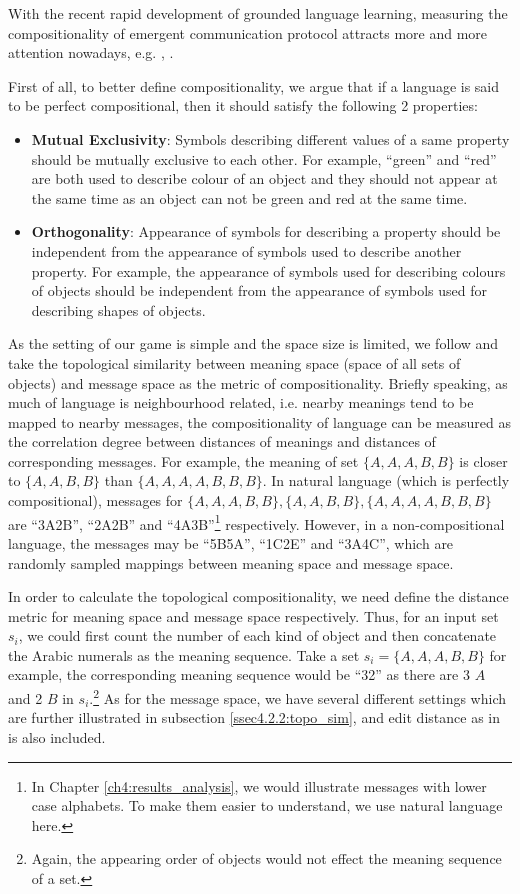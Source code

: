 With the recent rapid development of grounded language learning, measuring the compositionality of emergent communication protocol attracts more and more attention nowadays, e.g. \cite{andreas2019measuring}, \cite{lowe2019pitfalls}.

First of all, to better define compositionality, we argue that if a language is said to be perfect compositional, then it should satisfy the following 2 properties:

\begin{itemize}
    \item \textbf{Mutual Exclusivity}: Symbols describing different values of a same property should be mutually exclusive to each other. For example, ``green'' and ``red'' are both used to describe colour of an object and they should not appear at the same time as an object can not be green and red at the same time.
    \item \textbf{Orthogonality}: Appearance of symbols for describing a property should be independent from the appearance of symbols used to describe another property. For example, the appearance of symbols used for describing colours of objects should be independent from the appearance of symbols used for describing shapes of objects.
\end{itemize}

As the setting of our game is simple and the space size is limited, we follow \cite{brighton2006understanding} and take the topological similarity between meaning space (space of all sets of objects) and message space as the metric of compositionality. Briefly speaking, as much of language is neighbourhood related, i.e. nearby meanings tend to be mapped to nearby messages, the compositionality of language can be measured as the correlation degree between distances of meanings and distances of corresponding messages. For example, the meaning of set $\{A,A,A,B,B\}$ is closer to $\{A,A,B,B\}$ than $\{A,A,A,A,B,B,B\}$. In natural language (which is perfectly compositional), messages for  $\{A,A,A,B,B\}, \{A,A,B,B\}, \{A,A,A,A,B,B,B\}$ are ``3A2B'', ``2A2B'' and ``4A3B''\footnote{In Chapter \ref{ch4:results_analysis}, we would illustrate messages with lower case alphabets. To make them easier to understand, we use natural language here.} respectively. However, in a non-compositional language, the messages may be ``5B5A'', ``1C2E'' and ``3A4C'',  which are randomly sampled mappings between meaning space and message space.

In order to calculate the topological compositionality, we need define the distance metric for meaning space and message space respectively. Thus, for an input set $s_i$, we could first count the number of each kind of object and then concatenate the Arabic numerals as the meaning sequence. Take a set $s_i=\{A, A, A, B, B\}$ for example, the corresponding meaning sequence would be ``32'' as there are 3 $A$ and 2 $B$ in $s_i$.\footnote{Again, the appearing order of objects would not effect the meaning sequence of a set.} As for the message space, we have several different settings which are further illustrated in subsection \ref{ssec4.2.2:topo_sim}, and edit distance as in \cite{brighton2006understanding} is also included.

